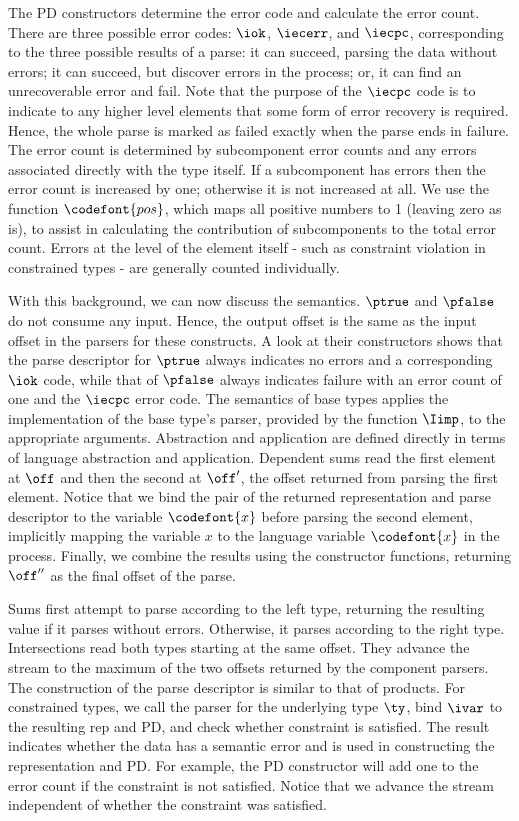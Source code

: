 The PD constructors determine the error code and calculate the error
count.  There are three possible error codes: $\iok$, $\iecerr$, and
$\iecpc$, corresponding to the three possible results of a parse: it
can succeed, parsing the data without errors; it can succeed, but
discover errors in the process; or, it can find an unrecoverable error
and fail.  Note that the purpose of the $\iecpc$ code is to
indicate to any higher level elements that some form of error recovery
is required.  Hence, the whole parse is marked as failed exactly when
the parse ends in failure.  The error count is determined by
subcomponent error counts and any errors associated directly with the
type itself.  If a subcomponent has errors then the error count is
increased by one; otherwise it is not increased at all. We use the
function $\codefont {pos}$, which maps all positive numbers to 1
(leaving zero as is), to assist in calculating the contribution of
subcomponents to the total error count.  Errors at the level of the
element itself - such as constraint violation in constrained types -
are generally counted individually.

With this background, we can now discuss the semantics.  $\ptrue$ and
$\pfalse$ do not consume any input. Hence, the output offset is the
same as the input offset in the parsers for these constructs. A look
at their constructors shows that the parse descriptor for $\ptrue$
always indicates no errors and a corresponding $\iok$ code, while that
of $\pfalse$ always indicates failure with an error count of one and
the $\iecpc$ error code. The semantics of base types applies the
implementation of the base type's parser, provided by the function
$\Iimp$, to the appropriate arguments.  Abstraction and application
are defined directly in terms of \implang language abstraction and
application.  Dependent sums read the first element at $\off$ and then
the second at $\off'$, the offset returned from parsing the first
element.  Notice that we bind the pair of the returned representation
and parse descriptor to the variable $\codefont{x}$ before parsing the
second element, implicitly mapping the \ddc{} variable $x$ to the
\implang{} language variable $\codefont{x}$ in the process.  Finally,
we combine the results using the constructor functions, returning
$\off''$ as the final offset of the parse.

Sums first attempt to parse according to the left type, returning the resulting
value if it parses without errors. Otherwise, it parses according to
the right type. Intersections read both types starting at the same
offset. They advance the stream to the maximum of the two offsets
returned by the component parsers. The construction of the parse
descriptor is similar to that of products. For constrained types, we call the
parser for the underlying type $\ty$, bind $\ivar$ to the resulting rep
and PD, and check whether constraint is satisfied. The result
indicates whether the data has a semantic error and is used in
constructing the representation and PD. For example, the PD constructor will add
one to the error count if the constraint is not satisfied. Notice that
we advance the stream independent of whether the constraint was
satisfied.

